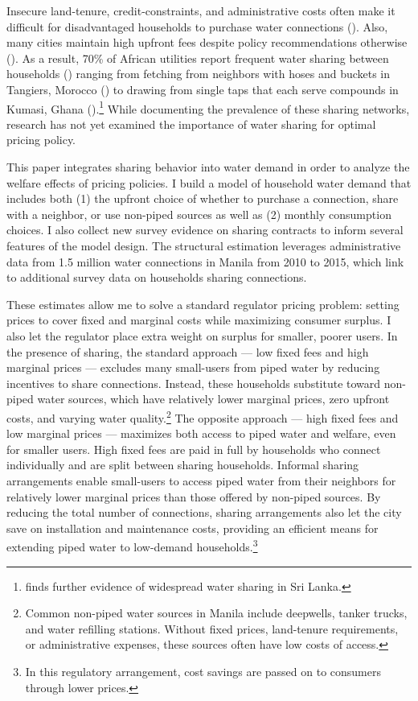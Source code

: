 \documentclass[12pt]{article}
\begin{document}

Insecure land-tenure, credit-constraints, and administrative costs often make it difficult for disadvantaged households to purchase water connections (\cite{devoto2012happiness}).  Also, many cities maintain high upfront fees despite policy recommendations otherwise (\cite{hoque2013state}).  As a result, 70\% of African utilities report frequent water sharing between households (\cite{keener2010provision}) ranging from fetching from neighbors with hoses and buckets in Tangiers, Morocco (\cite{devoto2012happiness}) to drawing from single taps that each serve compounds in Kumasi, Ghana (\cite{whittington1992possible}).\footnote{\cite{nauges2006water} finds further evidence of widespread water sharing in Sri Lanka.}  While documenting the prevalence of these  sharing networks, research has not yet examined the importance of water sharing for optimal pricing policy.  

This paper integrates sharing behavior into water demand in order to analyze the welfare effects of pricing policies.  I build a model of household water demand that includes both (1) the upfront choice of whether to purchase a connection, share with a neighbor, or use non-piped sources as well as (2) monthly consumption choices.  I also collect new survey evidence on sharing contracts to inform several features of the model design.  The structural estimation leverages administrative data from 1.5 million water connections in Manila from 2010 to 2015, which link to additional survey data on households sharing connections.  

These estimates allow me to solve a standard regulator pricing problem: setting prices to cover fixed and marginal costs while maximizing consumer surplus.  I also let the regulator place extra weight on surplus for smaller, poorer users.  In the presence of sharing, the standard approach --- low fixed fees and high marginal prices --- excludes many small-users from piped water by reducing incentives to share connections.  Instead, these households substitute toward non-piped water sources, which have relatively lower marginal prices, zero upfront costs, and varying water quality.\footnote{Common non-piped water sources in Manila include deepwells, tanker trucks, and water refilling stations.  Without fixed prices, land-tenure requirements, or administrative expenses, these sources often have low costs of access.}  The opposite approach --- high fixed fees and low marginal prices --- maximizes both access to piped water and welfare, even for smaller users.  High fixed fees are paid in full by households who connect individually and are split between sharing households.  Informal sharing arrangements enable small-users to access piped water from their neighbors for relatively lower marginal prices than those offered by non-piped sources.  By reducing the total number of connections, sharing arrangements also let the city save on installation and maintenance costs, providing an efficient means for extending piped water to low-demand households.\footnote{In this regulatory arrangement, cost savings are passed on to consumers through lower prices.}  
\end{document}
